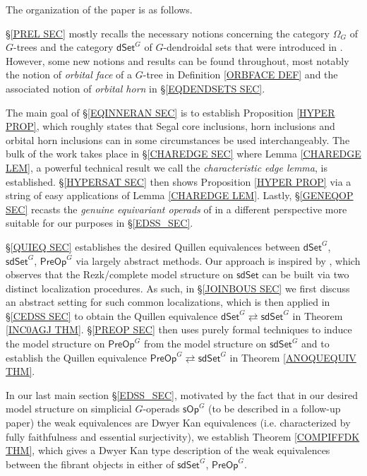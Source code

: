 \documentclass[a4paper,10pt
,draft
]{article}%
\begin{document}
\vskip 10pt

The organization of the paper is as follows.

\S \ref{PREL SEC} mostly recalls the necessary notions concerning the category $\Omega_G$ of $G$-trees and the category $\mathsf{dSet}^G$ of $G$-dendroidal sets 
that were introduced in \cite{Per18}.
However, some new notions and results can be found throughout, most notably the notion of \textit{orbital face} of a $G$-tree in Definition \ref{ORBFACE DEF}
and the associated notion of \textit{orbital horn} in 
\S \ref{EQDENDSETS SEC}.

The main goal of \S \ref{EQINNERAN SEC} is to establish
Proposition \ref{HYPER PROP},
which roughly states that Segal core inclusions, horn inclusions and orbital horn inclusions can in some circumstances be used interchangeably.
The bulk of the work takes place in 
\S \ref{CHAREDGE SEC} where Lemma \ref{CHAREDGE LEM},
a powerful technical result we call the
\textit{characteristic edge lemma}, is established.
\S \ref{HYPERSAT SEC} then shows Proposition \ref{HYPER PROP} via a string of easy applications of 
Lemma \ref{CHAREDGE LEM}.
Lastly, \S \ref{GENEQOP SEC} recasts the \textit{genuine equivariant operads} of \cite{BP17} in a different perspective more suitable for our purposes in \S \ref{EDSS_SEC}.

\S \ref{QUIEQ SEC} establishes the desired Quillen equivalences between 
$\mathsf{dSet}^G$, $\mathsf{sdSet}^G$, $\mathsf{PreOp}^G$
via largely abstract methods.
Our approach is inspired by 
\cite[Thm. 6.6]{CM13a}, which observes that the Rezk/complete model structure on $\mathsf{sdSet}$ can be built via two distinct localization procedures.
As such, in \S \ref{JOINBOUS SEC} we first discuss an abstract setting for such common localizations, 
which is then applied in \S \ref{CEDSS SEC} to obtain the Quillen equivalence
$\mathsf{dSet}^G \rightleftarrows \mathsf{sdSet}^G$
in Theorem \ref{INC0AGJ THM}.
\S \ref{PREOP SEC} then uses purely formal techniques to induce the model structure on
$\mathsf{PreOp}^G$ from the model structure on
$\mathsf{sdSet}^G$
and to establish the Quillen equivalence
$\mathsf{PreOp}^G \rightleftarrows \mathsf{sdSet}^G$
in Theorem \ref{ANOQUEQUIV THM}.

In our last main section \S \ref{EDSS_SEC},
motivated by the fact that in our desired model structure on simplicial $G$-operads $\mathsf{sOp}^G$
(to be described in a follow-up paper)
the weak equivalences are Dwyer Kan equivalences
(i.e. characterized by fully faithfulness and essential surjectivity), 
we establish Theorem \ref{COMPIFFDK THM}, which gives a Dwyer Kan type description of the weak equivalences 
between the fibrant objects in either of $\mathsf{sdSet}^G$, $\mathsf{PreOp}^G$.
\end{document}
